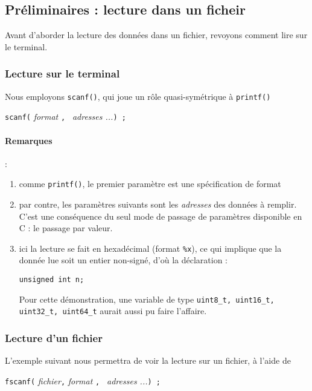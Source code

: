 \documentclass[10pt]{article}
\begin{document}
\subsection{Préliminaires : lecture dans un ficheir}
Avant d'aborder la lecture des données dans un fichier, revoyons comment
lire sur le terminal.

\subsubsection{Lecture sur le terminal}

Nous employons \texttt{scanf()}, qui joue un rôle
quasi-symétrique à \texttt{printf()}
\begin{center}
\texttt{scanf(} \emph{format} \texttt{, } \emph{adresses ...}\texttt{) ;}
\end{center}



\paragraph{Remarques} :
\begin{enumerate}
\item comme \texttt{printf()}, le premier paramètre est une spécification de format
\item par contre, les paramètres suivants sont les  \emph{adresses}
des données à remplir. C'est une conséquence du seul mode de
passage de paramètres disponible en C : le passage par valeur.
\item ici la lecture se fait en hexadécimal (format \texttt{\%x}), ce
  qui implique que la donnée lue soit un entier non-signé, d'où la
  déclaration :
  \begin{center}
\begin{verbatim}
unsigned int n;
\end{verbatim}
  \end{center}
Pour cette démonstration, une variable de type \texttt{uint8\_t, uint16\_t, uint32\_t, uint64\_t} aurait aussi pu faire l'affaire.

\end{enumerate}

\subsubsection{Lecture d'un fichier}

L'exemple suivant nous permettra de voir la lecture sur un fichier,
à l'aide de 
\begin{center}
\texttt{fscanf(} \emph{fichier}\texttt{,} \emph{format} \texttt{, } \emph{adresses ...}\texttt{) ;}
\end{center}
\end{document}
